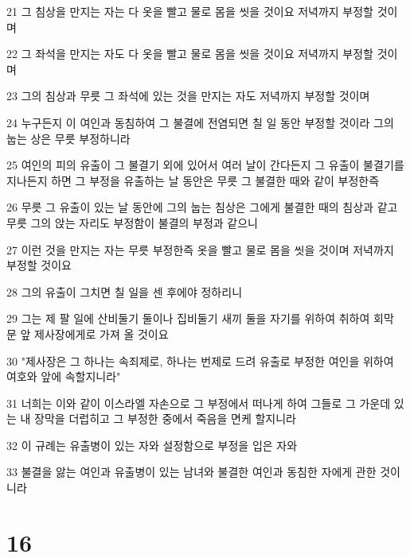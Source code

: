 \par 21 그 침상을 만지는 자는 다 옷을 빨고 물로 몸을 씻을 것이요 저녁까지 부정할 것이며
\par 22 그 좌석을 만지는 자도 다 옷을 빨고 물로 몸을 씻을 것이요 저녁까지 부정할 것이며
\par 23 그의 침상과 무릇 그 좌석에 있는 것을 만지는 자도 저녁까지 부정할 것이며
\par 24 누구든지 이 여인과 동침하여 그 불결에 전염되면 칠 일 동안 부정할 것이라 그의 눕는 상은 무릇 부정하니라
\par 25 여인의 피의 유출이 그 불결기 외에 있어서 여러 날이 간다든지 그 유출이 불결기를 지나든지 하면 그 부정을 유출하는 날 동안은 무릇 그 불결한 때와 같이 부정한즉
\par 26 무릇 그 유출이 있는 날 동안에 그의 눕는 침상은 그에게 불결한 때의 침상과 같고 무릇 그의 앉는 자리도 부정함이 불결의 부정과 같으니
\par 27 이런 것을 만지는 자는 무릇 부정한즉 옷을 빨고 물로 몸을 씻을 것이며 저녁까지 부정할 것이요
\par 28 그의 유출이 그치면 칠 일을 센 후에야 정하리니
\par 29 그는 제 팔 일에 산비둘기 둘이나 집비둘기 새끼 둘을 자기를 위하여 취하여 회막 문 앞 제사장에게로 가져 올 것이요
\par 30 "제사장은 그 하나는 속죄제로, 하나는 번제로 드려 유출로 부정한 여인을 위하여 여호와 앞에 속할지니라"
\par 31 너희는 이와 같이 이스라엘 자손으로 그 부정에서 떠나게 하여 그들로 그 가운데 있는 내 장막을 더럽히고 그 부정한 중에서 죽음을 면케 할지니라
\par 32 이 규례는 유출병이 있는 자와 설정함으로 부정을 입은 자와
\par 33 불결을 앓는 여인과 유출병이 있는 남녀와 불결한 여인과 동침한 자에게 관한 것이니라

\chapter{16}

